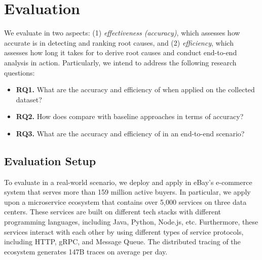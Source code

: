 \section{Evaluation}

We evaluate \system in two aspects: (1) \emph{effectiveness (accuracy)}, which assesses how accurate \system is in  detecting and ranking root causes, and (2) \emph{efficiency}, which assesses how long it takes for \system to derive root causes and conduct end-to-end analysis in action. Particularly, we intend to address the following research questions:


\begin{itemize}
    \item \textbf{RQ1.} What are the accuracy and efficiency of \system when applied on the collected dataset?
    \item \textbf{RQ2.} How does \system compare with baseline approaches in terms of accuracy?
    \item \textbf{RQ3.} What are the accuracy and efficiency of \system in an end-to-end scenario?
\end{itemize}


\subsection{Evaluation Setup}
\label{sec:evalset}
To evaluate \system in a real-world scenario, we deploy and apply \system  in eBay's e-commerce system that serves more than 159 million active buyers. In particular, we apply \system upon a microservice ecosystem that contains over 5,000 services on three data centers. These services are built on different tech stacks with different programming languages, including Java, Python, Node.js, etc. Furthermore, these services interact with each other by using different types of service protocols, including HTTP, gRPC,  and Message Queue. The distributed tracing of the ecosystem generates 147B traces on average per day.%
